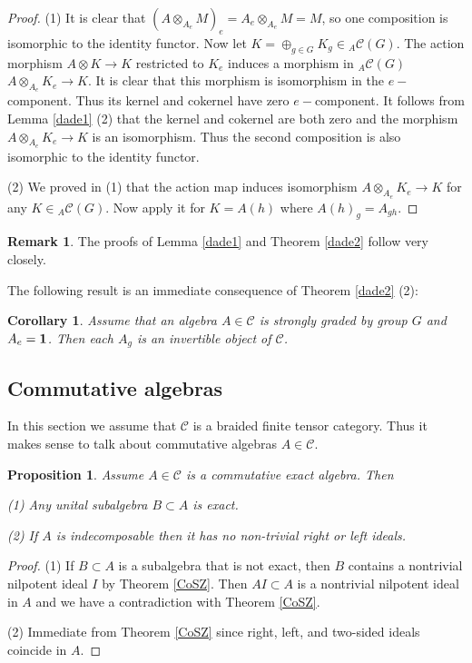 \documentclass{amsart}
\newtheorem{proposition}[theorem]{Proposition}
\newtheorem{corollary}[theorem]{Corollary}
\theoremstyle{definition}
\newtheorem{remark}[theorem]{Remark}
\newcommand{\C}{\mathcal{C}}
\newcommand{\be}{{\bf 1}}
\numberwithin{equation}{section}
\begin{document}
\begin{proof}
    (1) It is clear that $(A\otimes_{A_e}M)_e=A_e\otimes_{A_e}M=M$, so
    one composition is isomorphic to the identity functor. Now let
    $K=\oplus_{g\in G}K_g\in \phantom{}_A\C(G)$. The action morphism
    $A\otimes K\to K$ restricted to $K_e$ induces a morphism in $\phantom{}_A\C(G)$ $A\otimes_{A_e}K_e\to K$. It is clear that this
    morphism is isomorphism in the $e-$component. Thus its kernel and
    cokernel have zero $e-$component. It follows from Lemma \ref{dade1} (2) that the kernel and cokernel are both zero and the morphism 
    $A\otimes_{A_e}K_e\to K$ is an isomorphism. Thus the second composition is also isomorphic to the identity functor.

    (2) We proved in (1) that the action map induces isomorphism
    $A\otimes_{A_e}K_e\to K$ for any $K\in \phantom{}_A\C(G)$.
    Now apply it for $K=A(h)$ where $A(h)_g=A_{gh}$.
\end{proof}

\begin{remark}
    The proofs of Lemma \ref{dade1} and Theorem \ref{dade2} follow
    \cite[1.3]{NO} very closely.
\end{remark}

The following result is an immediate consequence of Theorem \ref{dade2} (2):

\begin{corollary}\label{dade3}
Assume that an algebra $A\in \C$ is strongly graded by group $G$ and 
$A_e=\be$. Then each $A_g$ is an invertible object of $\C$.
\end{corollary}

\subsection{Commutative algebras} In this section we assume that $\C$ is a braided finite
tensor category. Thus it makes sense to talk about commutative algebras $A\in \C$.

\begin{proposition}\label{subex}
   Assume $A\in \C$ is a commutative exact algebra. Then

   (1) Any unital subalgebra $B\subset A$ is exact.

   (2) If $A$ is indecomposable then it has no non-trivial right or left ideals.
\end{proposition}

\begin{proof}
    (1) If $B\subset A$ is a subalgebra that is not exact, then $B$ contains a nontrivial
    nilpotent ideal $I$ by Theorem \ref{CoSZ}. Then $AI\subset A$ is a nontrivial nilpotent
    ideal in $A$ and we have a contradiction with Theorem \ref{CoSZ}.

    (2) Immediate from Theorem \ref{CoSZ} since right, left, and two-sided ideals coincide in $A$.
\end{proof}
\end{document}
